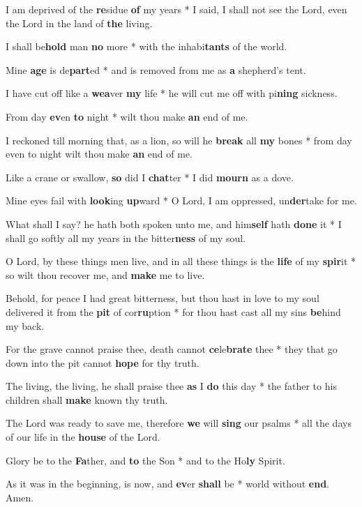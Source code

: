 \begin{multicols}{2}
	I am deprived of the \textbf{re}sidue \textbf{of} my years * I said, I shall not see the Lord, even the Lord in the land of \textbf{the} living.
	
	I shall be\textbf{hold} man \textbf{no} more * with the inhabi\textbf{tants} of the world.
	
	Mine \textbf{age} is de\textbf{part}ed * and is removed from me as \textbf{a} shepherd's tent.
	
	I have cut off like a \textbf{wea}ver \textbf{my} life * he will cut me off with pi\textbf{ning} sickness.
	
	From day \textbf{ev}en \textbf{to} night * wilt thou make \textbf{an} end of me.
	
	I reckoned till morning that, as a lion, so will he \textbf{break} all \textbf{my} bones * from day even to night wilt thou make \textbf{an} end of me.
	
	Like a crane or swallow, \textbf{so} did I \textbf{chat}ter * I did \textbf{mourn} as a dove.
	
	Mine eyes fail with \textbf{look}ing \textbf{up}ward * O Lord, I am oppressed, un\textbf{der}take for me.
	
	What shall I say? he hath both spoken unto me, and him\textbf{self} hath \textbf{done} it * I shall go softly all my years in the bitter\textbf{ness} of my soul.
	
	O Lord, by these things men live, and in all these things is the \textbf{life} of my \textbf{spir}it * so wilt thou recover me, and \textbf{make} me to live.
	
	Behold, for peace I had great bitterness, but thou hast in love to my soul delivered it from the \textbf{pit} of cor\textbf{ru}ption * for thou hast cast all my sins \textbf{be}hind my back.
	
	For the grave cannot praise thee, death cannot \textbf{ce}le\textbf{brate} thee * they that go down into the pit cannot \textbf{hope} for thy truth.
	
	The living, the living, he shall praise thee \textbf{as} I \textbf{do} this day * the father to his children shall \textbf{make} known thy truth.
	
	The Lord was ready to save me, therefore \textbf{we} will \textbf{sing} our psalms * all the days of our life in the \textbf{house} of the Lord.
	
	Glory be to the \textbf{Fa}ther, and \textbf{to} the Son * and to the Ho\textbf{ly} Spirit.
	
	As it was in the beginning, is now, and \textbf{ev}er \textbf{shall} be * world without \textbf{end}. Amen.
\end{multicols}